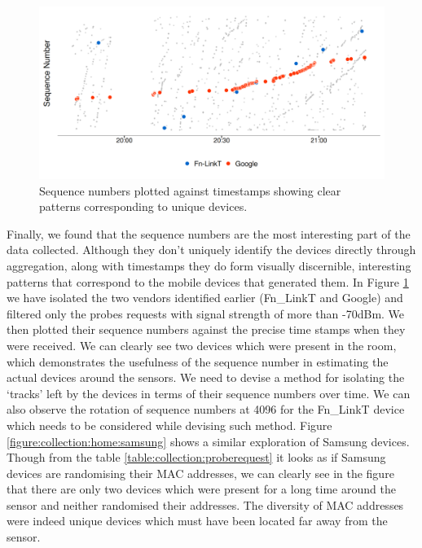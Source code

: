 \begin{figure}
  \includegraphics[trim = {0 10 0 0}, clip]{images/home-sequence-time.png}
  \caption{Sequence numbers plotted against timestamps showing clear patterns corresponding to unique devices.}
  \label{figure:collection:home:sequence}
\end{figure}

Finally, we found that the sequence numbers are the most interesting part of the data collected. 
Although they don't uniquely identify the devices directly through aggregation, along with timestamps they do form visually discernible, interesting patterns that correspond to the mobile devices that generated them.
In Figure \ref{figure:collection:home:sequence} we have isolated the two vendors identified earlier (Fn\_LinkT and Google) and filtered only the probes requests with signal strength of more than -70dBm.
We then plotted their sequence numbers against the precise time stamps when they were received.
We can clearly see two devices which were present in the room, which demonstrates the usefulness of the sequence number in estimating the actual devices around the sensors.
We need to devise a method for isolating the `tracks' left by the devices in terms of their sequence numbers over time.
We can also observe the rotation of sequence numbers at 4096 for the Fn\_LinkT device which needs to be considered while devising such method.
Figure \ref{figure:collection:home:samsung} shows a similar exploration of Samsung devices.
Though from the table \ref{table:collection:proberequest} it looks as if Samsung devices are randomising their MAC addresses, we can clearly see in the figure that there are only two devices which were present for a long time around the sensor and neither randomised their addresses.
The diversity of MAC addresses were indeed unique devices which must have been located far away from the sensor.

